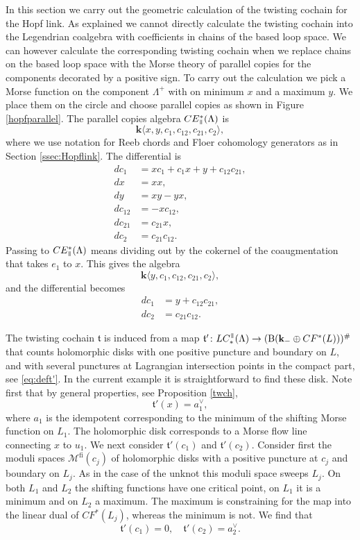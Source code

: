 \documentclass{gtpart}
\renewcommand{\k}{\mathbf{k}}
\renewcommand{\t}{\mathfrak{t}}
\renewcommand{\Bar}{\mathrm{B}}
\newcommand{\fl}{\mathrm{fi}}
\renewcommand{\parallel}{{\mkern3mu\vphantom{\perp}\vrule depth 0pt\mkern2mu\vrule depth
0pt\mkern3mu}}
\begin{document}
In this section we carry out the geometric calculation of the twisting cochain for the Hopf link. As
explained we cannot directly calculate the twisting cochain into the Legendrian coalgebra with
coefficients in chains of the based loop space. We can however calculate the corresponding twisting
cochain when we replace chains on the based loop space with the Morse theory of parallel copies for
the components decorated by a positive sign. To carry out the calculation we pick a Morse function
on the component $\Lambda^{+}$ with on minimum $x$ and a maximum $y$. We place them on the circle
and choose parallel copies as shown in Figure \ref{hopfparallel}. The parallel copies algebra $CE_{\parallel}^{\ast}(\Lambda)$ is
\[ 
\k\langle x,y,c_{1},c_{12},c_{21},c_{2}\rangle,
\]
where we use notation for Reeb chords and Floer cohomology generators as in Section \ref{ssec:Hopflink}. The differential is
\begin{align*}
d c_{1} &= xc_{1} + c_{1}x + y + c_{12}c_{21},\\
d x &= xx,\\
dy &= xy - yx,\\
dc_{12} &= -xc_{12},\\
dc_{21} &= c_{21}x,\\
dc_{2} &= c_{21}c_{12}.
\end{align*}
Passing to $CE^{\ast}_{\parallel}(\Lambda)$ means dividing out by the cokernel of the coaugmentation that takes $e_{1}$ to $x$. This gives the algebra
\[ 
\k\langle y,c_{1},c_{12},c_{21},c_{2}\rangle,
\]
and the differential becomes
\begin{align*}
d c_{1} &= y + c_{12}c_{21},\\
dc_{2} &= c_{21}c_{12}.
\end{align*}

The twisting cochain $\t$ is induced from a map $\t'\colon LC_{\ast}^{\parallel}(\Lambda)\to (\Bar(\k_{-}\oplus CF^{\ast}(L)))^{\#}$ that counts holomorphic disks with one positive puncture and boundary on $L$, and with several punctures at Lagrangian intersection points in the compact part, see \eqref{eq:deft'}. In the current example it is straightforward to find these disk. Note first that by general properties, see Proposition \ref{twch},
\[ 
\t'(x)=a_{1}^{\vee},
\]
where $a_{1}$ is the idempotent corresponding to the minimum of the shifting Morse function on $L_{1}$. The holomorphic disk corresponds to a Morse flow line connecting $x$ to $u_{1}$.  We next consider $\t'(c_{1})$ and $\t'(c_{2})$. Consider first the moduli spaces $\mathcal{M}^{\fl}(c_{j})$ of holomorphic disks with a positive puncture at $c_{j}$ and boundary on $L_{j}$. As in the case of the unknot this moduli space sweeps $L_{j}$. On both $L_{1}$ and $L_{2}$ the shifting functions have one critical point, on $L_{1}$
it is a minimum and on $L_{2}$ a maximum. The maximum is constraining for the map into the linear dual of $CF^{\ast}(L_{j})$, whereas the minimum is not. We find that
\[ 
\t'(c_{1})=0,\quad \t'(c_{2})= a_{2}^{\vee}.
\] 
\end{document}
